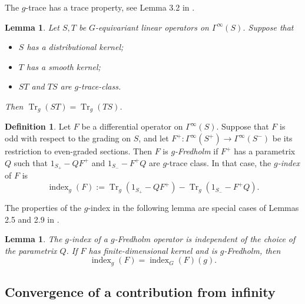 \documentclass[11pt]{article}
\theoremstyle{plain}
\newtheorem{lemma}[theorem]{Lemma}
\theoremstyle{definition}
\newtheorem{definition}[theorem]{Definition}
\theoremstyle{remark}
\numberwithin{equation}{section}
\DeclareMathOperator{\Tr}{Tr}
\DeclareMathOperator{\tr}{tr}
\DeclareMathOperator{\ind}{index}
\begin{document}
The $g$-trace has a trace property, see Lemma 3.2 in \cite{HWW}.
\begin{lemma}\label{lem Trg trace}
Let $S,T$ be $G$-equivariant linear operators on  $\Gamma^{\infty}(S)$. Suppose that
\begin{itemize}
\item $S$ has a distributional  kernel;
\item $T$ has a smooth kernel;
\item $ST$ and $TS$ are $g$-trace-class.
\end{itemize}
Then $\Tr_g(ST) = \Tr_g(TS)$.
\end{lemma}

\begin{definition}
Let $F$ be a differential operator on $\Gamma^{\infty}(S)$. Suppose that $F$ is odd with respect to the grading on $S$, and let $F^+\colon \Gamma^{\infty}(S^+) \to  \Gamma^{\infty}(S^-)$ be its restriction to even-graded sections. Then $F$ is \emph{$g$-Fredholm} if
$F^+$ has a parametrix $Q$ such that $1_{S_+} - QF^+$ and $1_{S_-} - F^+ Q$ are $g$-trace class. In that case, the \emph{$g$-index} of $F$ is
\[
\ind_g(F) := \Tr_g(1_{S_+} - QF^+) - \Tr_g(1_{S_-} - F^+ Q).
\]
\end{definition}


The  properties of the $g$-index in the following lemma are special cases of  Lemmas 2.5 and 2.9 in \cite{HWW}.
\begin{lemma}\label{lem inde ind}
The $g$-index of a $g$-Fredholm operator is independent of the choice of the parametrix $Q$. If $F$ has finite-dimensional kernel and is $g$-Fredholm, then
\[
\ind_g(F) = \ind_G(F)(g).
\]
\end{lemma}

\subsection{Convergence of a contribution from infinity}
\end{document}
